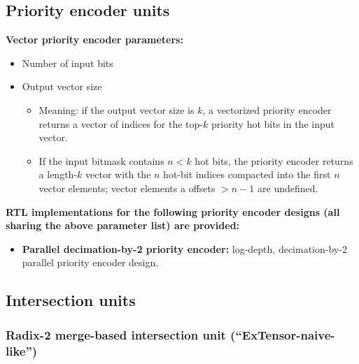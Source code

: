 \subsection{Priority encoder units}

\textbf{Vector priority encoder parameters:}

\begin{itemize}
    \item Number of input bits
    \item Output vector size
    
    \begin{itemize}
        \item Meaning: if the output vector size is $k$, a vectorized priority encoder returns a vector of indices for the top-$k$ priority hot bits in the input vector. 
        \item If the input bitmask contains $n < k$ hot bits, the priority encoder returns a length-$k$ vector with the $n$ hot-bit indices compacted into the first $n$ vector elements; vector elements a offsets $>n-1$ are undefined.
    \end{itemize}

\end{itemize}

\textbf{RTL implementations for the following priority encoder designs (all sharing the above parameter list) are provided:}

\begin{itemize}
    \item \textbf{Parallel decimation-by-2 priority encoder\cite{recursive_priority_encoder}:} log-depth, decimation-by-2 parallel priority encoder design.
\end{itemize}

\subsection{Intersection units}

\subsubsection{Radix-2 merge-based intersection unit (``ExTensor-naive-like'')}

